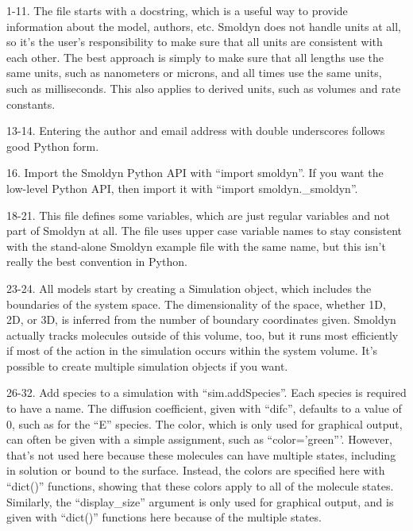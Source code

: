 \documentclass {scrbook}
\begin{document}
\begin{description}

\item{1-11.} The file starts with a docstring, which is a useful way to provide information about the model, authors, etc. Smoldyn does not handle units at all, so it's the user's responsibility to make sure that all units are consistent with each other. The best approach is simply to make sure that all lengths use the same units, such as nanometers or microns, and all times use the same units, such as milliseconds. This also applies to derived units, such as volumes and rate constants.

\item{13-14.} Entering the author and email address with double underscores follows good Python form.

\item{16.} Import the Smoldyn Python API with ``import smoldyn''. If you want the low-level Python API, then import it with ``import smoldyn.\_smoldyn''.

\item{18-21.} This file defines some variables, which are just regular variables and not part of Smoldyn at all. The file uses upper case variable names to stay consistent with the stand-alone Smoldyn example file with the same name, but this isn't really the best convention in Python.

\item{23-24.} All models start by creating a Simulation object, which includes the boundaries of the system space. The dimensionality of the space, whether 1D, 2D, or 3D, is inferred from the number of boundary coordinates given. Smoldyn actually tracks molecules outside of this volume, too, but it runs most efficiently if most of the action in the simulation occurs within the system volume. It's possible to create multiple simulation objects if you want.

\item{26-32.} Add species to a simulation with ``sim.addSpecies''. Each species is required to have a name. The diffusion coefficient, given with ``difc'', defaults to a value of 0, such as for the ``E'' species. The color, which is only used for graphical output, can often be given with a simple assignment, such as ``color='green'''. However, that's not used here because these molecules can have multiple states, including in solution or bound to the surface. Instead, the colors are specified here with ``dict()'' functions, showing that these colors apply to all of the molecule states. Similarly, the ``display\_size'' argument is only used for graphical output, and is given with ``dict()'' functions here because of the multiple states.


\end{description}
\end{document}
